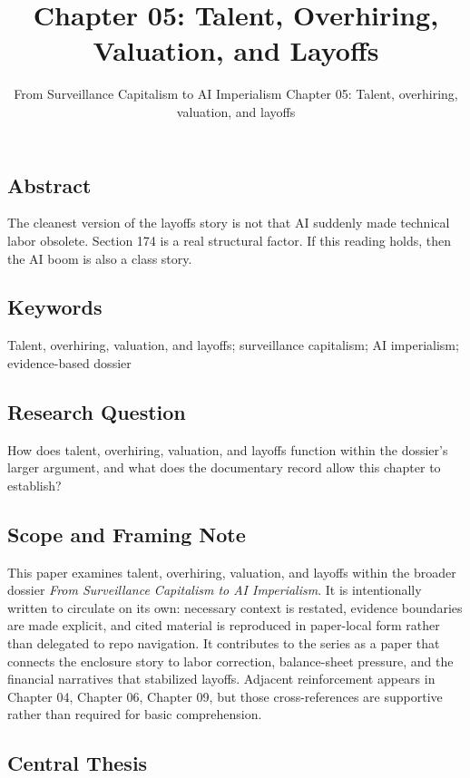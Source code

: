 \documentclass[
  american,
  11pt,
  letterpaper,
]{article}
\title{Chapter 05: Talent, Overhiring, Valuation, and Layoffs}
\subtitle{From Surveillance Capitalism to AI Imperialism \textbar{}
Chapter 05: Talent, overhiring, valuation, and layoffs}
\author{}
\date{}
\begin{document}
\maketitle

\subsection{Abstract}\label{abstract}

The cleanest version of the layoffs story is not that AI suddenly made
technical labor obsolete. Section 174 is a real structural factor. If
this reading holds, then the AI boom is also a class story.

\subsection{Keywords}\label{keywords}

Talent, overhiring, valuation, and layoffs; surveillance capitalism; AI
imperialism; evidence-based dossier

\subsection{Research Question}\label{research-question}

How does talent, overhiring, valuation, and layoffs function within the
dossier's larger argument, and what does the documentary record allow
this chapter to establish?

\subsection{Scope and Framing Note}\label{scope-and-framing-note}

This paper examines talent, overhiring, valuation, and layoffs within
the broader dossier \emph{From Surveillance Capitalism to AI
Imperialism}. It is intentionally written to circulate on its own:
necessary context is restated, evidence boundaries are made explicit,
and cited material is reproduced in paper-local form rather than
delegated to repo navigation. It contributes to the series as a paper
that connects the enclosure story to labor correction, balance-sheet
pressure, and the financial narratives that stabilized layoffs. Adjacent
reinforcement appears in Chapter 04, Chapter 06, Chapter 09, but those
cross-references are supportive rather than required for basic
comprehension.

\subsection{Central Thesis}\label{central-thesis}
\end{document}
